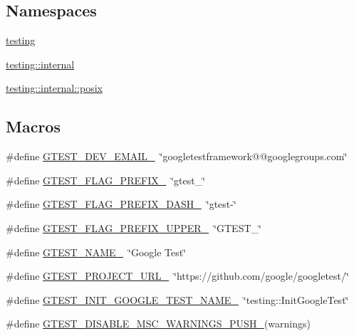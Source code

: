\subsection*{Namespaces}
\begin{DoxyCompactItemize}
\item 
 \hyperlink{namespacetesting}{testing}
\item 
 \hyperlink{namespacetesting_1_1internal}{testing\+::internal}
\item 
 \hyperlink{namespacetesting_1_1internal_1_1posix}{testing\+::internal\+::posix}
\end{DoxyCompactItemize}
\subsection*{Macros}
\begin{DoxyCompactItemize}
\item 
\#define \hyperlink{gtest-port_8h_a21086d276b1a64d6763ee8a94b12c1b8}{G\+T\+E\+S\+T\+\_\+\+D\+E\+V\+\_\+\+E\+M\+A\+I\+L\+\_\+}~\char`\"{}googletestframework@@googlegroups.\+com\char`\"{}
\item 
\#define \hyperlink{gtest-port_8h_a088e84784c589ba9b1fc48602ad8eabf}{G\+T\+E\+S\+T\+\_\+\+F\+L\+A\+G\+\_\+\+P\+R\+E\+F\+I\+X\+\_\+}~\char`\"{}gtest\+\_\+\char`\"{}
\item 
\#define \hyperlink{gtest-port_8h_a4251ff898f9f94ec6b8b9402c3436759}{G\+T\+E\+S\+T\+\_\+\+F\+L\+A\+G\+\_\+\+P\+R\+E\+F\+I\+X\+\_\+\+D\+A\+S\+H\+\_\+}~\char`\"{}gtest-\/\char`\"{}
\item 
\#define \hyperlink{gtest-port_8h_a4018b7f288f974d022df397e2730633a}{G\+T\+E\+S\+T\+\_\+\+F\+L\+A\+G\+\_\+\+P\+R\+E\+F\+I\+X\+\_\+\+U\+P\+P\+E\+R\+\_\+}~\char`\"{}G\+T\+E\+S\+T\+\_\+\char`\"{}
\item 
\#define \hyperlink{gtest-port_8h_a13d98c217176bd8722c395b9225fc19d}{G\+T\+E\+S\+T\+\_\+\+N\+A\+M\+E\+\_\+}~\char`\"{}Google Test\char`\"{}
\item 
\#define \hyperlink{gtest-port_8h_a5aa3c938fc1d049f1d9c5332f6a0b1d4}{G\+T\+E\+S\+T\+\_\+\+P\+R\+O\+J\+E\+C\+T\+\_\+\+U\+R\+L\+\_\+}~\char`\"{}https\+://github.\+com/google/googletest/\char`\"{}
\item 
\#define \hyperlink{gtest-port_8h_aa5e27ad4f88278501ef71bd9ddbb44c6}{G\+T\+E\+S\+T\+\_\+\+I\+N\+I\+T\+\_\+\+G\+O\+O\+G\+L\+E\+\_\+\+T\+E\+S\+T\+\_\+\+N\+A\+M\+E\+\_\+}~\char`\"{}testing\+::\+Init\+Google\+Test\char`\"{}
\item 
\#define \hyperlink{gtest-port_8h_a86994cc68e844d8b82089c70408dfc61}{G\+T\+E\+S\+T\+\_\+\+D\+I\+S\+A\+B\+L\+E\+\_\+\+M\+S\+C\+\_\+\+W\+A\+R\+N\+I\+N\+G\+S\+\_\+\+P\+U\+S\+H\+\_\+}(warnings)

\end{DoxyCompactItemize}
